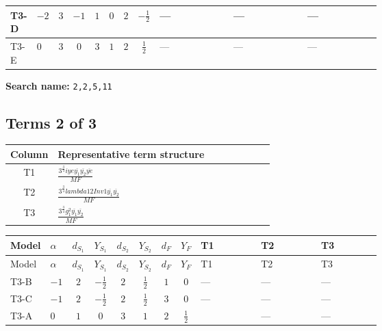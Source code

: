 \documentclass[8pt]{article}
\begin{document}
\begin{landscape}
\begin{longtable}{@{}llcccccc >{\raggedright\arraybackslash}p{0.21\linewidth} >{\raggedright\arraybackslash}p{0.21\linewidth} >{\raggedright\arraybackslash}p{0.21\linewidth}@{}}
\midrule
T3-D & $-2$ & $3$ & $-1$ & $1$ & $0$ & $2$ & $-\frac{1}{2}$ & --- & --- & --- \\
\midrule
T3-E & $0$ & $3$ & $0$ & $3$ & $1$ & $2$ & $\frac{1}{2}$ & --- & --- & --- \\
\midrule
\bottomrule
\end{longtable}
\clearpage
\noindent\textbf{Search name: }\texttt{2,2,5,11}\par\smallskip
\subsection*{Terms 2 of 3}
\begin{center}
\begin{tabular}{@{}c >{\raggedright\arraybackslash}p{0.82\linewidth}@{}}
\toprule
Column & Representative term structure \\
\midrule
T1 & \(\displaystyle \frac{3^{\frac{3}{4}} i ye \overline{y_{1}} \overline{y_{2}} \overline{ye}}{MF}\) \\
\midrule
T2 & \(\displaystyle \frac{3^{\frac{3}{4}} lambda12Inv1 \overline{y_{1}} \overline{y_{2}}}{MF}\) \\
\midrule
T3 & \(\displaystyle \frac{3^{\frac{3}{4}} g_{1}^{2} \overline{y_{1}} \overline{y_{2}}}{MF}\) \\
\midrule
\bottomrule
\end{tabular}
\end{center}
\smallskip
\tiny
\begin{longtable}{@{}llcccccc >{\raggedright\arraybackslash}p{0.21\linewidth} >{\raggedright\arraybackslash}p{0.21\linewidth} >{\raggedright\arraybackslash}p{0.21\linewidth}@{}}
\toprule
Model & $\alpha$ & $d_{S_1}$ & $Y_{S_1}$ & $d_{S_2}$ & $Y_{S_2}$ & $d_F$ & $Y_F$ & T1 & T2 & T3 \\
\midrule
\endfirsthead
\toprule
Model & $\alpha$ & $d_{S_1}$ & $Y_{S_1}$ & $d_{S_2}$ & $Y_{S_2}$ & $d_F$ & $Y_F$ & T1 & T2 & T3 \\
\midrule
\endhead
T3-B & $-1$ & $2$ & $-\frac{1}{2}$ & $2$ & $\frac{1}{2}$ & $1$ & $0$ & --- & --- & --- \\
\midrule
T3-C & $-1$ & $2$ & $-\frac{1}{2}$ & $2$ & $\frac{1}{2}$ & $3$ & $0$ & --- & --- & --- \\
\midrule
T3-A & $0$ & $1$ & $0$ & $3$ & $1$ & $2$ & $\frac{1}{2}$ & \scriptsize\adjustbox{max width=\linewidth}{$\begin{gathered} \frac{3^{\frac{3}{4}} i ye \overline{y_{1}} \overline{y_{2}} \overline{ye}}{12 MF}\end{gathered}$} & --- & --- \\

\end{longtable}
\end{landscape}
\end{document}
